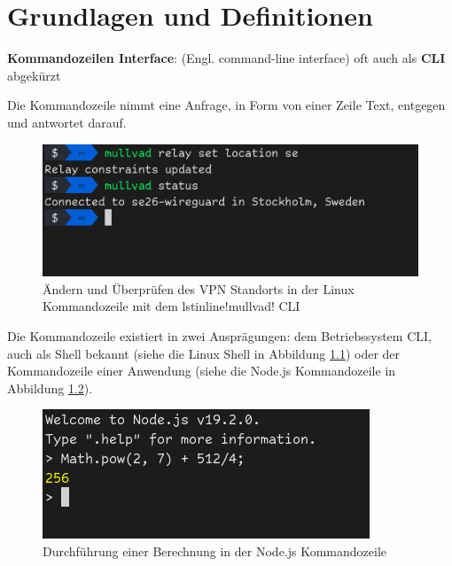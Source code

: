 \documentclass[oneside,bibliography=totocnumbered,BCOR=5mm]{scrbook}
\newcommand{\codeinline}[1]{\colorbox{mygray}{\csname lstinline\endcsname!#1!}}
\begin{document}
\chapter{Grundlagen und Definitionen}


\textbf{Kommandozeilen Interface}: (Engl. command-line interface) oft auch als \textbf{CLI} abgekürzt

Die Kommandozeile nimmt eine Anfrage, in Form von einer Zeile Text, entgegen und antwortet darauf.

\begin{figure}
  \centering
  \includegraphics[scale=0.5]{mullvad-status.png}
  \caption{Ändern und Überprüfen des VPN Standorts in der Linux Kommandozeile mit dem \codeinline{mullvad} CLI}
  \label{fig:mullvad-status}
\end{figure}

Die Kommandozeile existiert in zwei Ausprägungen: dem Betriebssystem CLI, auch als Shell bekannt (siehe die Linux Shell in Abbildung \ref{fig:mullvad-status}) oder der Kommandozeile einer Anwendung (siehe die Node.js Kommandozeile in Abbildung \ref{fig:node-calc}).

\begin{figure}
  \centering
  \includegraphics[scale=0.5]{node-calc.png}
  \caption{Durchführung einer Berechnung in der Node.js Kommandozeile}
  \label{fig:node-calc}
\end{figure}
\end{document}
